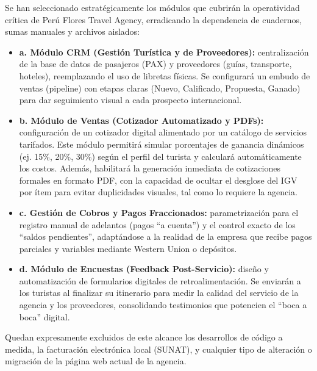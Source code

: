 \begin{indentedsubsection}
Se han seleccionado estratégicamente los módulos que cubrirán la operatividad crítica de Perú Flores Travel Agency, erradicando la dependencia de cuadernos, sumas manuales y archivos aislados:

\begin{itemize}
    \item \textbf{a. Módulo CRM (Gestión Turística y de Proveedores):} centralización de la base de datos de pasajeros (PAX) y proveedores (guías, transporte, hoteles), reemplazando el uso de libretas físicas. Se configurará un embudo de ventas (pipeline) con etapas claras (Nuevo, Calificado, Propuesta, Ganado) para dar seguimiento visual a cada prospecto internacional.
    \item \textbf{b. Módulo de Ventas (Cotizador Automatizado y PDFs):} configuración de un cotizador digital alimentado por un catálogo de servicios tarifados. Este módulo permitirá simular porcentajes de ganancia dinámicos (ej. 15\%, 20\%, 30\%) según el perfil del turista y calculará automáticamente los costos. Además, habilitará la generación inmediata de cotizaciones formales en formato PDF, con la capacidad de ocultar el desglose del IGV por ítem para evitar duplicidades visuales, tal como lo requiere la agencia.
    \item \textbf{c. Gestión de Cobros y Pagos Fraccionados:} parametrización para el registro manual de adelantos (pagos ``a cuenta'') y el control exacto de los ``saldos pendientes'', adaptándose a la realidad de la empresa que recibe pagos parciales y variables mediante Western Union o depósitos.
    \item \textbf{d. Módulo de Encuestas (Feedback Post-Servicio):} diseño y automatización de formularios digitales de retroalimentación. Se enviarán a los turistas al finalizar su itinerario para medir la calidad del servicio de la agencia y los proveedores, consolidando testimonios que potencien el ``boca a boca'' digital.
\end{itemize}

Quedan expresamente excluidos de este alcance los desarrollos de código a medida, la facturación electrónica local (SUNAT), y cualquier tipo de alteración o migración de la página web actual de la agencia.
\end{indentedsubsection}

